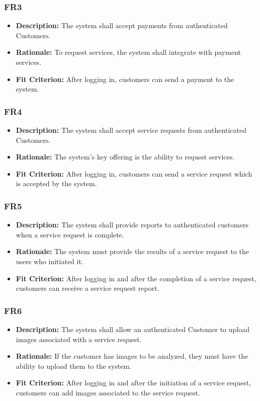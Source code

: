 \documentclass[12pt]{article}
\begin{document}
\subsubsection*{FR3}
\begin{itemize}
  \item \textbf{Description:} The system shall accept payments from authenticated Customers.
  \item \textbf{Rationale:} To request services, the system shall integrate with payment services.
  \item \textbf{Fit Criterion:} After logging in, customers can send a payment to the system.
\end{itemize}
\subsubsection*{FR4}
\begin{itemize}
  \item \textbf{Description:} The system shall accept service requests from authenticated Customers.
  \item \textbf{Rationale:} The system’s key offering is the ability to request services.
  \item \textbf{Fit Criterion:} After logging in, customers can send a service request which is accepted by the system.
\end{itemize}
\subsubsection*{FR5}
\begin{itemize}
  \item \textbf{Description:} The system shall provide reports to authenticated customers when a service request is complete.
  \item \textbf{Rationale:} The system must provide the results of a service request to the users who initiated it.
  \item \textbf{Fit Criterion:} After logging in and after the completion of a service request, customers can receive a service request report.
\end{itemize}
\subsubsection*{FR6}
\begin{itemize}
  \item \textbf{Description:} The system shall allow an authenticated Customer to upload images associated with a service request.
  \item \textbf{Rationale:} If the customer has images to be analyzed, they must have the ability to upload them to the system.
  \item \textbf{Fit Criterion:} After logging in and after the initiation of a service request, customers can add images associated to the service request.
\end{itemize}
\end{document}
